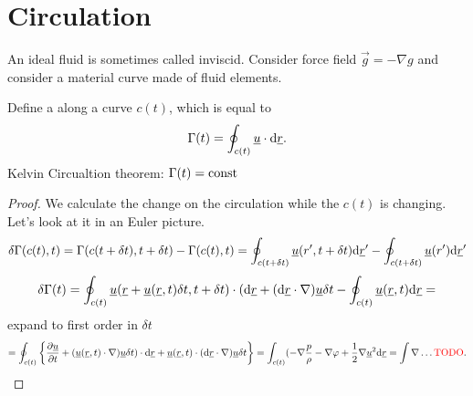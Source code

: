 \documentclass[../main.tex]{subfiles}
\begin{document}
  \section{Circulation}
  An ideal fluid is sometimes called inviscid.
  Consider force field $\vec g = - \nabla g$ and consider a material curve made of fluid elements.

  Define a   along a curve $c(t)$, which is equal to 
  \begin{displaymath}
    \Gamma(t) = \oint_{c(t)} \underline{u} \cdot \mathrm{d} \underline{r}.
  \end{displaymath}
  Kelvin Circualtion theorem: $\Gamma(t) = \textrm{const}$

  \begin{proof}
    
    We calculate the change on the circulation while the $c(t)$ is changing.
    Let's look at it in an Euler picture.
    \begin{displaymath}
      \delta \Gamma(c(t),t) = \Gamma(c(t + \delta t), t + \delta t) - \Gamma(c(t), t) 
      = \oint_{c(t + \delta t)} \underline{u}( r', t + \delta t) \mathrm{d} \underline{r}' 
      - \oint_{c(t + \delta t)} \underline{u}( r') \mathrm{d} \underline{r}' 
    \end{displaymath}
    \begin{displaymath}
      \delta \Gamma(t) = \oint_{c(t)} \underline{u}( \underline{r} + \underline{u}(\underline{r}, t) \delta t, t + \delta t) \cdot ( \mathrm{d} \underline{r} + ( \mathrm{d} \underline{r} \cdot \nabla) \underline{u} \delta t
      - \oint_{c(t)}\underline{u}(\underline{r}, t) \mathrm{d} \underline{r} = 
    \end{displaymath}
    expand to first order in $\delta t$
    \begin{displaymath}
      = \oint_{c(t)} \left\{ \frac{\partial \underline{u}}{\partial t} + (\underline{u}(\underline{r}, t)\cdot \nabla ) \underline{u}\delta t) \cdot \mathrm{d} \underline{r} + \underline{u} (\underline{r}, t) \cdot (\mathrm{d} \underline{r} \cdot \nabla ) \underline{u} \delta t \right\}
      =\int_{c(t)} (- \nabla \frac{p}{\rho} - \nabla \varphi + \frac{1}{2} \nabla \underline{u}^2\mathrm{d} \underline{r}  = \int\nabla \dots\textrm{\textcolor{red}{TODO}}.
    \end{displaymath}
  \end{proof}
\end{document}
